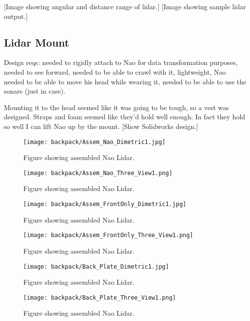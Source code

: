 [Image showing angular and distance range of lidar.]
[Image showing sample lidar output.]



\subsection{Lidar Mount}
Design reqs: needed to rigidly attach to Nao for data transformation purposes, needed to see forward,
needed to be able to crawl with it, lightweight, Nao needed to be able to move his head while wearing it,
needed to be able to use the sonars (just in case).

Mounting it to the head seemed like it was going to be tough, so a vest was designed.
Straps and foam seemed like they'd hold well enough. In fact they hold so well I can lift Nao up by the mount.
[Show Solidworks design.]
\begin{figure}
  \centering
  \texttt{[image: backpack/Assem\_Nao\_Dimetric1.jpg]}
  \caption{Figure showing assembled Nao Lidar.}
  \label{fig:nao_lidar_mount_nao_dimetric1}
\end{figure}

\begin{figure}
  \centering
  \texttt{[image: backpack/Assem\_Nao\_Three\_View1.png]}
  \caption{Figure showing assembled Nao Lidar.}
  \label{fig:nao_lidar_mount_nao_three_view1}
\end{figure}

\begin{figure}
  \centering
  \texttt{[image: backpack/Assem\_FrontOnly\_Dimetric1.jpg]}
  \caption{Figure showing assembled Nao Lidar.}
  \label{fig:nao_lidar_mount_dimetric1}
\end{figure}

\begin{figure}
  \centering
  \texttt{[image: backpack/Assem\_FrontOnly\_Three\_View1.png]}
  \caption{Figure showing assembled Nao Lidar.}
  \label{fig:nao_lidar_mount_three_view1}
\end{figure}

\begin{figure}
  \centering
  \texttt{[image: backpack/Back\_Plate\_Dimetric1.jpg]}
  \caption{Figure showing assembled Nao Lidar.}
  \label{fig:nao_lidar_mount_backplate_dimetric1}
\end{figure}

\begin{figure}
  \centering
  \texttt{[image: backpack/Back\_Plate\_Three\_View1.png]}
  \caption{Figure showing assembled Nao Lidar.}
  \label{fig:nao_lidar_mount_backplate_three_view1}
\end{figure}

